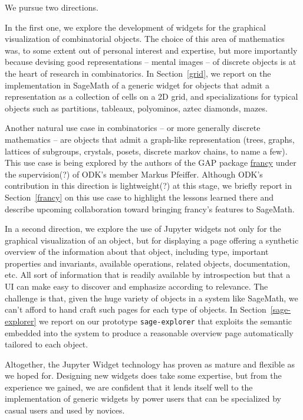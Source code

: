 \documentclass{deliverablereport}
\begin{document}
We pursue two directions.

In the first one, we explore the development of widgets for the
graphical visualization of combinatorial objects.
The choice of this area of mathematics was, to some extent
out of personal interest and expertise, but more importantly because
devising good representations -- mental images -- of discrete objects
is at the heart of research in combinatorics. In Section~\ref{grid},
we report on the implementation in SageMath of a generic widget for
objects that admit a representation as a collection of cells on a 2D
grid, and specializations for typical objects such as partitions,
tableaux, polyominos, aztec diamonds, mazes.


Another natural use case in combinatorics -- or more generally
discrete mathematics -- are objects that admit a graph-like
representation (trees, graphs, lattices of subgroups, crystals,
posets, discrete markov chains, to name a few). This use case is being
explored by the authors of the GAP package
\href{https://github.com/mcmartins/francy}{francy} under the
supervision(?) of ODK's member Markus Pfeiffer. Although ODK's
contribution in this direction is lightweight(?) at this stage, we
briefly report in Section~\ref{francy} on this use case to highlight
the lessons learned there and describe upcoming collaboration toward
bringing francy's features to SageMath.

In a second direction, we explore the use of Jupyter widgets not only
for the graphical visualization of an object, but for displaying a
page offering a synthetic overview of the information about that
object, including type, important properties and invariants, available
operations, related objects, documentation, etc. All sort of
information that is readily available by introspection but that a UI
can make easy to discover and emphasize according to relevance. The
challenge is that, given the huge variety of objects in a system like
SageMath, we can't afford to hand craft such pages for each type of
objects. In Section~\ref{sage-explorer} we report on our prototype
\lstinline{sage-explorer} that exploits the semantic embedded into the
system to produce a reasonable overview page automatically tailored to
each object.



Altogether, the Jupyter Widget technology has proven as mature and
flexible as we hoped for. Designing new widgets does take some
expertise, but from the experience we gained, we are confident that it
lends itself well to the implementation of generic widgets by power
users that can be specialized by casual users and used by novices.
\end{document}
